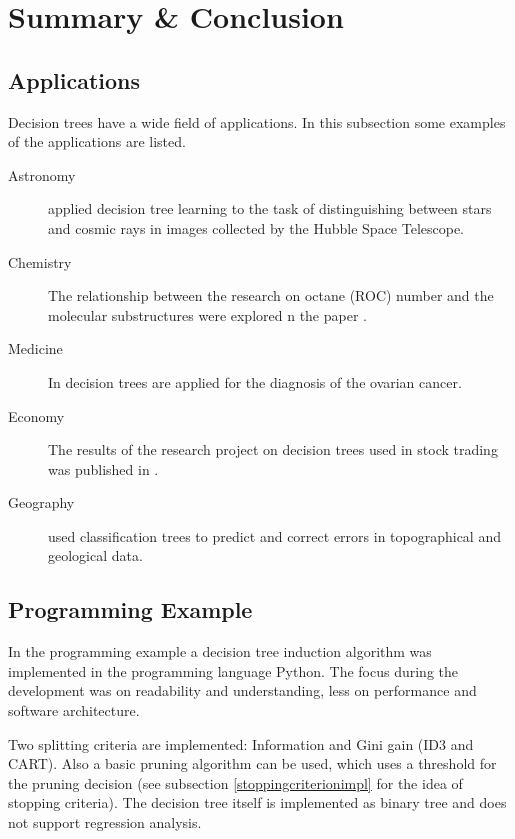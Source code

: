 
\newpage


\section{Summary \& Conclusion}

\subsection{Applications}

Decision trees have a wide field of applications. In this subsection some examples of the applications are listed.

\begin{description}
    \item[Astronomy] \cite{salzberg1995decision} applied decision tree learning to the task of distinguishing between stars and cosmic rays in images collected by the Hubble Space Telescope.
    \item[Chemistry] The relationship between the research on octane (ROC) number and the molecular substructures were explored n the paper \cite{blurock1995automatic}.
    \item[Medicine] In \cite{vlahou2003diagnosis} decision trees are applied for the diagnosis of the ovarian cancer.     
    \item[Economy] The results of the research project on decision trees used in stock trading was published in \cite{wu2006effective}.
    \item[Geography] \cite{lagacherie1997addressing} used classification trees to predict and correct errors in topographical and geological data.
\end{description}



\subsection{Programming Example}

In the programming example a decision tree induction algorithm was implemented in the programming language Python. The focus during the development was on readability and understanding, less on performance and software architecture. 

Two splitting criteria are implemented: Information and Gini gain (ID3 and CART). Also a basic pruning algorithm can be used, which uses a threshold for the pruning decision (see subsection \ref{stoppingcriterionimpl} for the idea of stopping criteria). The decision tree itself is implemented as binary tree and does not support regression analysis.

